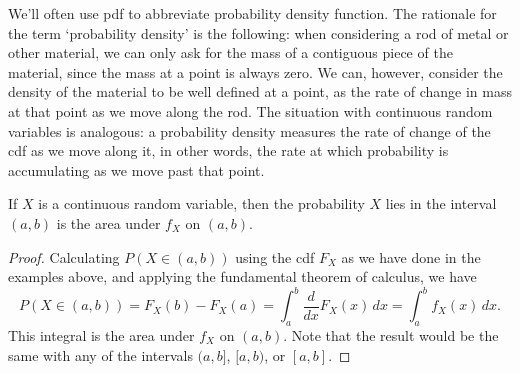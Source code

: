 We'll often use pdf to abbreviate probability density function. The rationale for the term `probability density' is the following: when considering a rod of metal or other material, we can only ask for the mass of a contiguous piece of the material, since the mass at a point is always zero. We can, however, consider the density of the material to be well defined at a point, as the rate of change in mass at that point as we move along the rod. The situation with continuous random variables is analogous: a probability density measures the rate of change of the cdf as we move along it, in other words, the rate at which probability is accumulating as we move past that point.

\begin{proposition}If $X$ is a continuous random variable, then the probability $X$ lies in the interval $(a,b)$ is the area under $f_X$ on $(a,b)$.
\end{proposition}

\begin{proof} Calculating $P(X \in (a,b))$ using the cdf $F_X$ as we have done in the examples above, and applying the fundamental theorem of calculus, we have
$$P(X \in (a,b)) = F_X(b) - F_X(a) = \int_{a}^{b} \frac{d}{dx} F_X(x) \, dx = \int_{a}^{b} f_X(x) \, dx.$$
This integral is the area under $f_X$ on $(a,b)$. Note that the result would be the same with any of the intervals $(a,b]$, $[a,b)$, or $[a,b]$. \end{proof}

